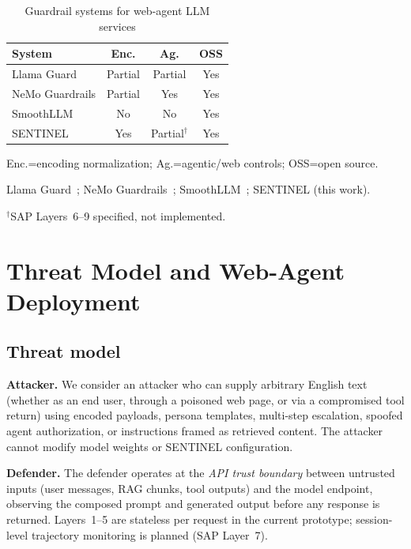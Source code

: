 \documentclass[conference]{IEEEtran}
\newcommand{\tablestretch}{1.18}
\newcommand{\tablesetup}{\small\renewcommand{\arraystretch}{\tablestretch}\setlength{\tabcolsep}{4pt}}
\begin{document}
\begin{table}[t]
\centering
\tablesetup
\caption{Guardrail systems for web-agent LLM services}
\label{tab:related}
\begin{threeparttable}
\begin{tabularx}{\columnwidth}{@{}>{\raggedright\arraybackslash}X c c c@{}}
\toprule
\rowcolor{headerblue!14}
\textbf{System} & \textbf{Enc.} & \textbf{Ag.} & \textbf{OSS} \\
\midrule
Llama Guard & Partial & Partial & Yes \\
\rowcolor{lightgray}
NeMo Guardrails & Partial & Yes & Yes \\
SmoothLLM & No & No & Yes \\
\rowcolor{lightgray}
SENTINEL & Yes & Partial$^\dagger$ & Yes \\
\bottomrule
\end{tabularx}
\begin{tablenotes}[flushleft]
\footnotesize
\item Enc.=encoding normalization; Ag.=agentic/web controls; OSS=open source.
\item Llama Guard~\cite{inan2023llama}; NeMo Guardrails~\cite{rebedea2023nemo};
SmoothLLM~\cite{robey2023smoothllm}; SENTINEL (this work).
\item $^\dagger$SAP Layers~6--9 specified, not implemented.
\end{tablenotes}
\end{threeparttable}
\end{table}

\section{Threat Model and Web-Agent Deployment}
\label{sec:threat}

\subsection{Threat model}

\textbf{Attacker.} We consider an attacker who can supply arbitrary English text (whether as an
end user, through a poisoned web page, or via a compromised tool return) using encoded payloads, persona templates, multi-step escalation, spoofed agent
authorization, or instructions framed as retrieved content.
The attacker cannot modify model weights or SENTINEL configuration.

\textbf{Defender.} The defender operates at the \emph{API trust boundary} between untrusted inputs
(user messages, RAG chunks, tool outputs) and the model endpoint, observing the
composed prompt and generated output before any response is returned.
Layers~1--5 are stateless per request in the current prototype; session-level
trajectory monitoring is planned (SAP Layer~7).
\end{document}
